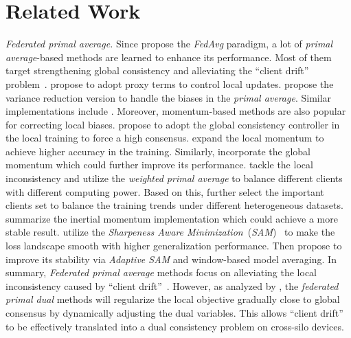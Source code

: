 \section{Related Work}
\label{related work}

\textit{Federated primal average.} Since \citet{mcmahan2017communication} propose the \textit{FedAvg} paradigm, a lot of \textit{primal average}-based methods are learned to enhance its performance. Most of them target strengthening global consistency and alleviating the ``client drift'' problem~\citep{karimireddy2020scaffold}. \citet{li2020federated} propose to adopt proxy terms to control local updates. \citet{karimireddy2020scaffold} propose the variance reduction version to handle the biases in the \textit{primal average}. Similar implementations include \citep{dieuleveut2021federated,jhunjhunwala2022fedvarp}. Moreover, momentum-based methods are also popular for correcting local biases. \citet{ozfatura2021fedadc,xu2021fedcm} propose to adopt the global consistency controller in the local training to force a high consensus. \citet{remedios2020federated} expand the local momentum to achieve higher accuracy in the training. Similarly, \citet{slowmo,kim2022communication} incorporate the global momentum which could further improve its performance. \citet{wang2020tackling} tackle the local inconsistency and utilize the \textit{weighted primal average} to balance different clients with different computing power. Based on this, \citet{horvath2022fedshuffle} further select the important clients set to balance the training trends under different heterogeneous datasets. \citet{liu2023enhance} summarize the inertial momentum implementation which could achieve a more stable result. \citet{qu2022generalized} utilize the \textit{Sharpeness Aware Minimization}~(\textit{SAM})~\citep{foret2020sharpness} to make the loss landscape smooth with higher generalization performance. Then \citet{caldarola2022improving,caldarola2023window} propose to improve its stability via \textit{Adaptive SAM} and window-based model averaging. In summary, \textit{Federated primal average} methods focus on alleviating the local inconsistency caused by ``client drift''~\citep{inconsistency2,inconsistency3,inconsistency1}. However, as analyzed by \citet{durmus2021federated}, the \textit{federated primal dual} methods will regularize the local objective gradually close to global consensus by dynamically adjusting the dual variables. This allows ``client drift'' to be effectively translated into a dual consistency problem on cross-silo devices.


